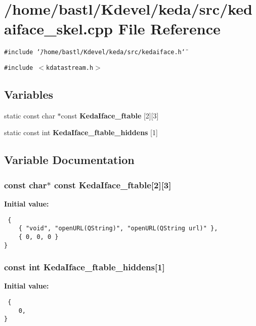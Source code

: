 \section{/home/bastl/Kdevel/keda/src/kedaiface\_\-skel.cpp File Reference}
\label{kedaiface__skel_8cpp}
{\tt \#include \char`\"{}/home/bastl/Kdevel/keda/src/kedaiface.h\char`\"{}}\par
{\tt \#include $<$kdatastream.h$>$}\par
\subsection*{Variables}
\begin{CompactItemize}
\item 
static const char $\ast$const {\bf Keda\-Iface\_\-ftable} [2][3]
\item 
static const int {\bf Keda\-Iface\_\-ftable\_\-hiddens} [1]
\end{CompactItemize}


\subsection{Variable Documentation}
\subsubsection{\setlength{\rightskip}{0pt plus 5cm}const char$\ast$ const {\bf Keda\-Iface\_\-ftable}[2][3]\hspace{0.3cm}{\tt  [static]}}\label{kedaiface__skel_8cpp_2da16fe21624b8c2dc12ceed02f09d36}


{\bf Initial value:}

\footnotesize\begin{verbatim} {
    { "void", "openURL(QString)", "openURL(QString url)" },
    { 0, 0, 0 }
}
\end{verbatim}\normalsize 
{}
\subsubsection{\setlength{\rightskip}{0pt plus 5cm}const int {\bf Keda\-Iface\_\-ftable\_\-hiddens}[1]\hspace{0.3cm}{\tt  [static]}}\label{kedaiface__skel_8cpp_212bfd0bdf6a046146c9736abac238ca}


{\bf Initial value:}

\footnotesize\begin{verbatim} {
    0,
}
\end{verbatim}\normalsize 
